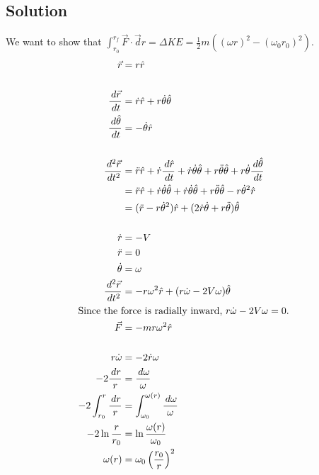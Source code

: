 \documentclass[solutions]{esg8012pset}
\renewcommand{\d}{\,d}
\begin{document}
\subsection*{Solution}
  We want to show that $\displaystyle \int_{r_0}^{r_f}\vec F \cdot \vec d r = \Delta KE = \frac{1}{2}m\left((\omega r)^2 - (\omega_0 r_0)^2\right)$.
  \begin{align*}
  \vec r & = r \hat r \\
  \\
  \frac{\d \vec r}{\d t} & = \dot r\hat r + r\dot\theta\hat\theta \\
  \frac{\d \hat \theta}{\d t} & = -\dot\theta\hat r \\
  \\
  \frac{\d^2 \vec r}{\d t^2} & = \ddot r\hat r + \dot r\frac{\d \hat r}{\d t} + \dot r\dot\theta\hat\theta + r\ddot\theta\hat\theta + r\dot\theta\frac{\d \hat\theta}{\d t} \\
    & = \ddot r\hat r + \dot r\dot\theta\hat\theta + \dot r\dot\theta\hat\theta + r\ddot\theta\hat\theta - r\dot\theta^2\hat r \\
    & = (\ddot r - r\dot\theta^2)\hat r + (2\dot r\dot\theta + r\ddot\theta)\hat\theta \\
  \\
  \dot r & = -V \\
  \ddot r & = 0 \\
  \dot\theta & = \omega \\
  \frac{\d^2 \vec r}{\d t^2} & = -r\omega^2\hat r + (r\dot\omega - 2V\omega)\hat\theta \\
  \intertext{Since the force is radially inward, $r\dot\omega - 2V\omega = 0$.}
  \vec F & = -mr\omega^2\hat r \\
  \\
  r\dot\omega & = -2\dot r\omega \\
  -2\frac{\d r}{r} & = \frac{\d \omega}{\omega} \\
  -2\int_{r_0}^{r}\frac{\d r}{r} & = \int_{\omega_0}^{\omega(r)}\frac{\d \omega}{\omega} \\
  -2\ln\frac{r}{r_0} & = \ln\frac{\omega(r)}{\omega_0} \\
  \omega(r) & = \omega_0 \left(\frac{r_0}{r}\right)^2\\

\end{align*}
\end{document}
